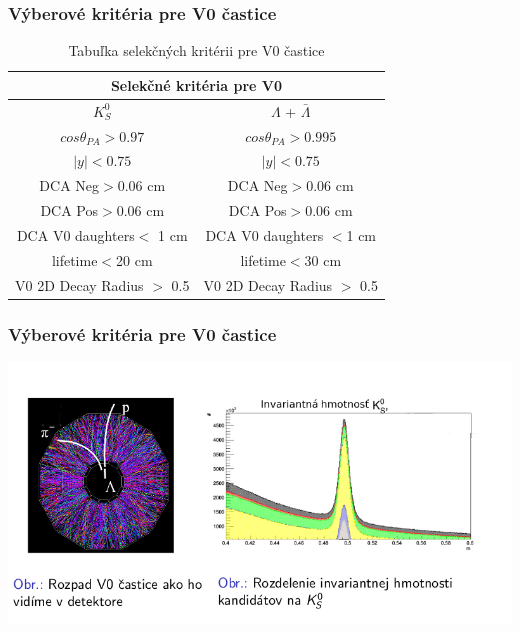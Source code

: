 \documentclass{beamer}
\begin{document}
	\begin{frame}
	\frametitle{Výberové kritéria pre V0 častice}
	\begin{table}[hbtp!]
		\begin{center}
			\begin{tabular}{|c|c|}
				\hline
				\multicolumn{2}{|c|}{Selekčné kritéria pre V0}  \\ \hline
				$K^0_S$ & $\Lambda$ + $\bar{\Lambda}$ \\ \hline
				$cos\theta_{PA} >0.97$ & $cos\theta_{PA} >0.995$  \\ \hline
				$|y|<0.75$ & $|y|<0.75$   \\ \hline
				DCA Neg$>$0.06 cm & DCA Neg$>$0.06 cm \\ \hline
				DCA Pos$>$0.06 cm & DCA Pos$>$0.06 cm \\ \hline
				DCA V0 daughters$<$ 1 cm & DCA V0 daughters $<$1 cm \\ \hline
				lifetime$<$20 cm & lifetime$<$30 cm \\ \hline
				V0 2D Decay Radius $>$ 0.5 & V0 2D Decay Radius $>$ 0.5\\ 
				\hline
			\end{tabular}
			\caption{Tabuľka selekčných kritérii pre V0 častice}
			\label{tabulka}
		\end{center}
	\end{table}

	\end{frame}

	\begin{frame}
		\frametitle{Výberové kritéria pre V0 častice}
		\centering \includegraphics[scale=0.6]{../Obrazky_praca/SelekcneV0.png}
			
	\end{frame}
\end{document}
